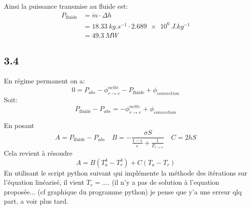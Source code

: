 \documentclass[12pt]{article}
\begin{document}
Ainsi la puissance transmise au fluide est:
\begin{align*}
P_{\text{fluide}} &= \dot{m} \cdot \Delta h \\ &= \SI{18.33}{kg.s^{-1}} \cdot \SI{2.689e6}{J.kg^{-1}} \\ &= \boxed{\SI{49.3}{MW}}
\end{align*}

\subsection*{3.4}
En régime permanent on a:
\[
0 = P_{abs} - \phi^{nette}_{r \rightarrow e} - P_{\text{fluide}} + \phi_{convection}
\]
Soit:
\[
P_{\text{fluide}} - P_{abs}  = -\phi^{nette}_{r \rightarrow e} + \phi_{convection}
\]

En posant
\[
A = P_{\text{fluide}} - P_{abs} \quad B = -\frac{\sigma S}{\frac{1-\epsilon}{\epsilon} + \frac{1}{F_{r \rightarrow e}}} \quad C = 2hS
\]
Cela revient à résoudre
\[
A = B(T_a^4 - T_r^4) + C(T_a - T_r)
\]
En utilisant le script python suivant qui implémente la méthode des itérations sur l'équation linéarisé, il vient $T_r=...$. (il n'y a pas de solution à l'equation proposée... (cf graphique du programme python) je pense que y'a une erreur qlq part, a voir plus tard.


\end{document}

